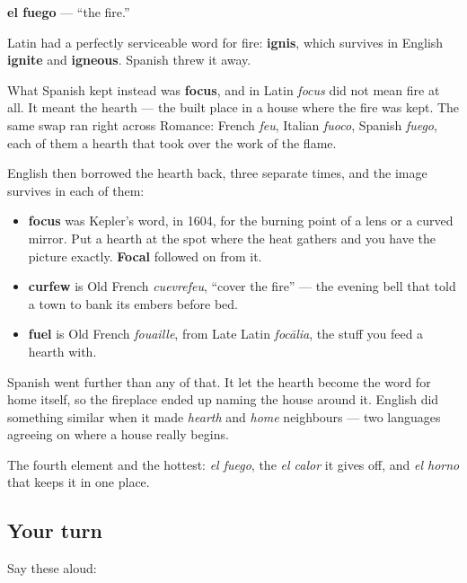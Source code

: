 \begin{cousinweb}
\textbf{el fuego} — \textquotedblleft{}the fire.\textquotedblright{}

Latin had a perfectly serviceable word for fire: \textbf{ignis}, which survives in English \textbf{ignite} and \textbf{igneous}. Spanish threw it away.

What Spanish kept instead was \textbf{focus}, and in Latin \emph{focus} did not mean fire at all. It meant the hearth — the built place in a house where the fire was kept. The same swap ran right across Romance: French \emph{feu}, Italian \emph{fuoco}, Spanish \emph{fuego}, each of them a hearth that took over the work of the flame.

English then borrowed the hearth back, three separate times, and the image survives in each of them:

\begin{itemize}
\raggedright
  \item \textbf{focus} was Kepler's word, in 1604, for the burning point of a lens or a curved mirror. Put a hearth at the spot where the heat gathers and you have the picture exactly. \textbf{Focal} followed on from it.
  \item \textbf{curfew} is Old French \emph{cuevrefeu}, \textquotedblleft{}cover the fire\textquotedblright{} — the evening bell that told a town to bank its embers before bed.
  \item \textbf{fuel} is Old French \emph{fouaille}, from Late Latin \emph{focālia}, the stuff you feed a hearth with.
\end{itemize}

Spanish went further than any of that. It let the hearth become the word for home itself, so the fireplace ended up naming the house around it. English did something similar when it made \emph{hearth} and \emph{home} neighbours — two languages agreeing on where a house really begins.
\end{cousinweb}

\begin{grammarlens}[title={What you've built}]
The fourth element and the hottest: \emph{el fuego}, the \emph{el calor} it gives off, and \emph{el horno} that keeps it in one place.
\end{grammarlens}

\subsection*{Your turn}
Say these aloud:

